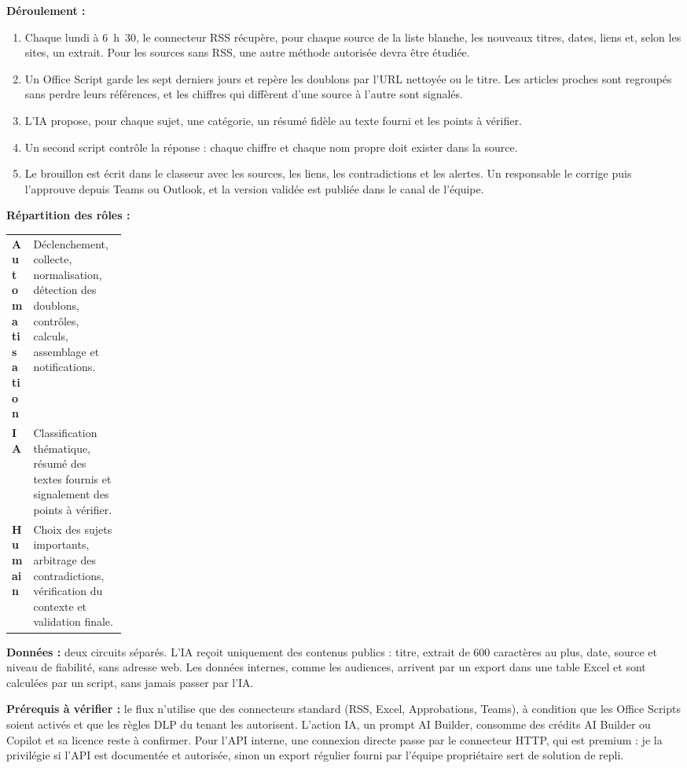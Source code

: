 \documentclass[10pt,a4paper]{article}
\newcommand{\solution}[1]{\textbf{\color{teal}#1 :}}
\newcommand{\verif}[1]{\textbf{\color{brique}#1 :}}
\begin{document}
\solution{Déroulement}
\begin{enumerate}
\item Chaque lundi à 6~h~30, le connecteur RSS récupère, pour chaque source de la liste blanche, les nouveaux titres, dates, liens et, selon les sites, un extrait. Pour les sources sans RSS, une autre méthode autorisée devra être étudiée.
\item Un Office Script garde les sept derniers jours et repère les doublons par l’URL nettoyée ou le titre. Les articles proches sont regroupés sans perdre leurs références, et les chiffres qui diffèrent d’une source à l’autre sont signalés.
\item L’IA propose, pour chaque sujet, une catégorie, un résumé fidèle au texte fourni et les points à vérifier.
\item Un second script contrôle la réponse : chaque chiffre et chaque nom propre doit exister dans la source.
\item Le brouillon est écrit dans le classeur avec les sources, les liens, les contradictions et les alertes. Un responsable le corrige puis l’approuve depuis Teams ou Outlook, et la version validée est publiée dans le canal de l’équipe.
\end{enumerate}

\solution{Répartition des rôles}\par\vspace{1pt}
{\small
\begin{tabularx}{\linewidth}{>{\bfseries}p{0.17\linewidth}L}
\toprule
Automatisation & Déclenchement, collecte, normalisation, détection des doublons, contrôles, calculs, assemblage et notifications.\\
IA & Classification thématique, résumé des textes fournis et signalement des points à vérifier.\\
Humain & Choix des sujets importants, arbitrage des contradictions, vérification du contexte et validation finale.\\
\bottomrule
\end{tabularx}}

\solution{Données} deux circuits séparés. L’IA reçoit uniquement des contenus publics : titre, extrait de 600 caractères au plus, date, source et niveau de fiabilité, sans adresse web. Les données internes, comme les audiences, arrivent par un export dans une table Excel et sont calculées par un script, sans jamais passer par l’IA.

\verif{Prérequis à vérifier} le flux n’utilise que des connecteurs standard (RSS, Excel, Approbations, Teams), à condition que les Office Scripts soient activés et que les règles DLP du tenant les autorisent. L’action IA, un prompt AI Builder, consomme des crédits AI Builder ou Copilot et sa licence reste à confirmer. Pour l’API interne, une connexion directe passe par le connecteur HTTP, qui est premium : je la privilégie si l’API est documentée et autorisée, sinon un export régulier fourni par l’équipe propriétaire sert de solution de repli.
\end{document}

